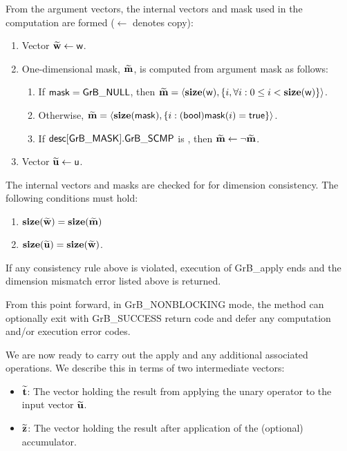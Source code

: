 From the argument vectors, the internal vectors and mask used in 
the computation are formed ($\leftarrow$ denotes copy):
\begin{enumerate}
	\item Vector ${\bf \widetilde{w}} \leftarrow {\sf w}$.

	\item One-dimensional mask, ${\bf \widetilde{m}}$, is computed from 
    argument {\sf mask} as follows:
	\begin{enumerate}
		\item	If ${\sf mask} = {\sf GrB\_NULL}$, then ${\bf \widetilde{m}} = 
        \langle \bold{size}({\sf w}), \{i, \forall i : 0 \leq i < 
        \bold{size}({\sf w}) \} \rangle$.

		\item	Otherwise, ${\bf \widetilde{m}} = 
        \langle \bold{size}({\sf mask}), \{i : ({\sf bool}){\sf mask}(i) = 
        {\sf true}\} \rangle$.

		\item	If ${\sf desc[GrB\_MASK].GrB\_SCMP}$ is \true, then 
        ${\bf \widetilde{m}} \leftarrow \neg {\bf \widetilde{m}}$.
	\end{enumerate}

	\item Vector ${\bf \widetilde{u}} \leftarrow {\sf u}$.
    
\end{enumerate}

The internal vectors and masks are checked for for dimension consistency. 
The following conditions must hold:
\begin{enumerate}
	\item $\bold{size}({\bf \widetilde{w}}) = \bold{size}({\bf \widetilde{m}})$
	\item $\bold{size}({\bf \widetilde{u}}) = \bold{size}({\bf \widetilde{w}})$.
\end{enumerate}
If any consistency rule above is violated, execution of {\sf GrB\_apply} ends and 
the dimension mismatch error listed above is returned.

From this point forward, in {\sf GrB\_NONBLOCKING} mode, the method can optionally exit
with {\sf GrB\_SUCCESS} return code and defer any computation and/or execution error codes.

We are now ready to carry out the apply and any additional 
associated operations.  We describe this in terms of two intermediate vectors:
\begin{itemize}
	\item ${\bf \widetilde{t}}$: The vector holding the result from applying the unary operator to the input vector
    ${\bf \widetilde{u}}$.
	\item ${\bf \widetilde{z}}$: The vector holding the result after 
    application of the (optional) accumulator.
\end{itemize}

